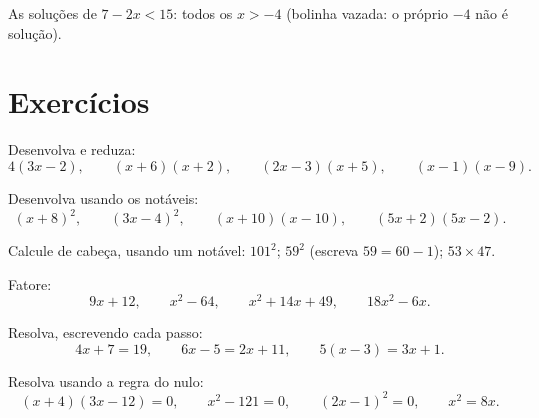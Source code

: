 \begin{omfigure}

{\small As soluções de $7 - 2x < 15$: todos os $x > -4$ (bolinha
vazada: o próprio $-4$ não é solução).}
\end{omfigure}

\section{Exercícios}

\begin{exercise}[$\star$]\label{exo:g9:algebra:1}
Desenvolva e reduza:
\[
4(3x - 2), \qquad
(x + 6)(x + 2), \qquad
(2x - 3)(x + 5), \qquad
(x - 1)(x - 9).
\]
\end{exercise}

\begin{exercise}[$\star$]\label{exo:g9:algebra:2}
Desenvolva usando os  notáveis:
\[
(x + 8)^2, \qquad
(3x - 4)^2, \qquad
(x + 10)(x - 10), \qquad
(5x + 2)(5x - 2).
\]
\end{exercise}

\begin{exercise}[$\star$]\label{exo:g9:algebra:3}
Calcule de cabeça, usando um  notável: $101^2$; \quad $59^2$
(escreva $59 = 60 - 1$); \quad $53 \times 47$.
\end{exercise}

\begin{exercise}[$\star$]\label{exo:g9:algebra:4}
Fatore:
\[
9x + 12, \qquad
x^2 - 64, \qquad
x^2 + 14x + 49, \qquad
18x^2 - 6x .
\]
\end{exercise}

\begin{exercise}[$\star$]\label{exo:g9:algebra:5}
Resolva, escrevendo cada passo:
\[
4x + 7 = 19, \qquad
6x - 5 = 2x + 11, \qquad
5(x - 3) = 3x + 1 .
\]
\end{exercise}

\begin{exercise}[$\star\star$]\label{exo:g9:algebra:6}
Resolva usando a regra do  nulo:
\[
(x + 4)(3x - 12) = 0, \qquad
x^2 - 121 = 0, \qquad
(2x - 1)^2 = 0, \qquad
x^2 = 8x .
\]
\end{exercise}


